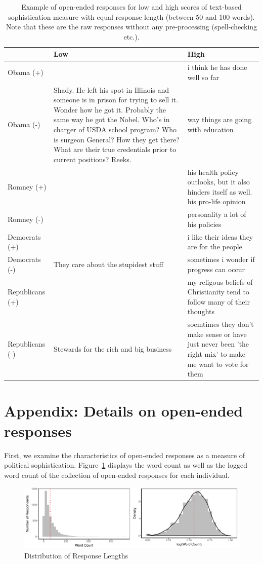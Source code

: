 \documentclass[12pt]{article}
\begin{document}
\begin{table}\footnotesize\centering
\begin{tabular}[ht]{lp{7cm}p{7cm}}
   \toprule
  & Low & High \\ 
   \midrule
   Obama (+) &  & i think he has done well so far \\ 
   Obama (-) & Shady. He left his spot in Illinois and someone is in prison for trying to sell it. Wonder how he got it. Probably the same way he got the Nobel. Who's in charger of USDA school program? Who is surgeon General? How they get there? What are their true credentials prior to current positions? Reeks. & way things are going with education \\ 
   Romney (+) &  & his health policy outlooks, but it also hinders itself as well. his pro-life opinion \\ 
   Romney (-) &  & personality a lot of his policies \\ 
   Democrats (+) &  & i like their ideas they are for the people \\ 
   Democrats (-) & They care about the stupidest stuff & sometimes i wonder if progress can occur \\ 
   Republicans (+) &  & my religous beliefs of Christianity tend to follow many of their thoughts \\ 
   Republicans (-) & Stewards for the rich and big business & soemtimes they don't make sense or have just never been 'the right mix' to make me want to vote for them \\ 
    \bottomrule
    \end{tabular}
  \caption{Example of open-ended responses for low and high scores of text-based sophistication measure with equal response length (between 50 and 100 words). Note that these are the raw responses without any pre-processing (spell-checking etc.).}
  \end{table}
  
\clearpage
\section{Appendix: Details on open-ended responses}

First, we examine the characteristics of open-ended responses as a measure of political sophistication. Figure~\ref{fig:wc} displays the word count as well as the logged word count of the collection of open-ended responses for each individual.

\begin{figure}[h]
\includegraphics[width=\textwidth]{../fig/wc.pdf}
\caption{Distribution of Response Lengths}\label{fig:wc}
\end{figure}
\end{document}
